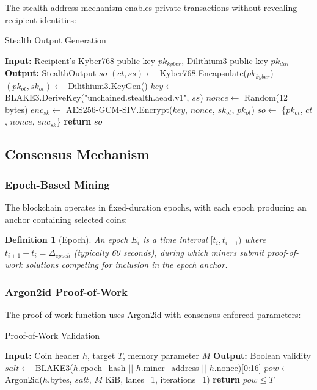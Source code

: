 \documentclass[12pt,a4paper]{article}
\newtheorem{definition}{Definition}
\begin{document}
The stealth address mechanism enables private transactions without revealing recipient identities:

\begin{algorithm}
\caption{Stealth Output Generation}
\begin{algorithmic}
\STATE \textbf{Input:} Recipient's Kyber768 public key $pk_{kyber}$, Dilithium3 public key $pk_{dili}$
\STATE \textbf{Output:} StealthOutput $so$
\STATE $(ct, ss) \leftarrow$ Kyber768.Encapsulate($pk_{kyber}$)
\STATE $(pk_{ot}, sk_{ot}) \leftarrow$ Dilithium3.KeyGen()
\STATE $key \leftarrow$ BLAKE3.DeriveKey("unchained.stealth.aead.v1", $ss$)
\STATE $nonce \leftarrow$ Random(12 bytes)
\STATE $enc_{sk} \leftarrow$ AES256-GCM-SIV.Encrypt($key$, $nonce$, $sk_{ot}$, $pk_{ot}$)
\STATE $so \leftarrow$ \{$pk_{ot}$, $ct$, $nonce$, $enc_{sk}$\}
\STATE \textbf{return} $so$
\end{algorithmic}
\end{algorithm}

\subsection{Consensus Mechanism}

\subsubsection{Epoch-Based Mining}

The blockchain operates in fixed-duration epochs, with each epoch producing an anchor containing selected coins:

\begin{definition}[Epoch]
An epoch $E_i$ is a time interval $[t_i, t_{i+1})$ where $t_{i+1} - t_i = \Delta_{epoch}$ (typically 60 seconds), during which miners submit proof-of-work solutions competing for inclusion in the epoch anchor.
\end{definition}

\subsubsection{Argon2id Proof-of-Work}

The proof-of-work function uses Argon2id with consensus-enforced parameters:

\begin{algorithm}
\caption{Proof-of-Work Validation}
\begin{algorithmic}
\STATE \textbf{Input:} Coin header $h$, target $T$, memory parameter $M$
\STATE \textbf{Output:} Boolean validity
\STATE $salt \leftarrow$ BLAKE3($h$.epoch\_hash $||$ $h$.miner\_address $||$ $h$.nonce)[0:16]
\STATE $pow \leftarrow$ Argon2id($h$.bytes, $salt$, $M$ KiB, lanes=1, iterations=1)
\STATE \textbf{return} $pow \leq T$
\end{algorithmic}
\end{algorithm}
\end{document}
